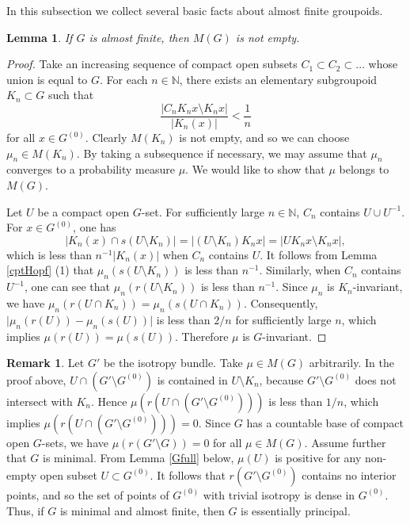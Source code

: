 \documentclass[11pt]{article}
\newtheorem{lem}[thm]{Lemma}
\theoremstyle{definition}
\newtheorem{rem}[thm]{Remark}
\newcommand{\N}{\mathbb{N}}
\begin{document}
In this subsection 
we collect several basic facts about almost finite groupoids. 

\begin{lem}\label{Mneqempty}
If $G$ is almost finite, then $M(G)$ is not empty. 
\end{lem}
\begin{proof}
Take an increasing sequence of compact open subsets 
$C_1\subset C_2\subset\dots$ whose union is equal to $G$. 
For each $n\in\N$, 
there exists an elementary subgroupoid $K_n\subset G$ such that 
\[
\frac{\lvert C_nK_nx\setminus K_nx\rvert}{\lvert K_n(x)\rvert}<\frac{1}{n}
\]
for all $x\in G^{(0)}$. 
Clearly $M(K_n)$ is not empty, and so we can choose $\mu_n\in M(K_n)$. 
By taking a subsequence if necessary, 
we may assume that $\mu_n$ converges to a probability measure $\mu$. 
We would like to show that $\mu$ belongs to $M(G)$. 

Let $U$ be a compact open $G$-set. 
For sufficiently large $n\in\N$, $C_n$ contains $U\cup U^{-1}$. 
For $x\in G^{(0)}$, one has 
\[
\lvert K_n(x)\cap s(U\setminus K_n)\rvert
=\lvert (U\setminus K_n)K_nx\rvert=\lvert UK_nx\setminus K_nx\rvert, 
\]
which is less than $n^{-1}\lvert K_n(x)\rvert$ 
when $C_n$ contains $U$. 
It follows from Lemma \ref{cptHopf} (1) that 
$\mu_n(s(U\setminus K_n))$ is less than $n^{-1}$. 
Similarly, when $C_n$ contains $U^{-1}$, 
one can see that $\mu_n(r(U\setminus K_n))$ is less than $n^{-1}$. 
Since $\mu_n$ is $K_n$-invariant, 
we have $\mu_n(r(U\cap K_n))=\mu_n(s(U\cap K_n))$. 
Consequently, $\lvert\mu_n(r(U))-\mu_n(s(U))\rvert$ is less than $2/n$ 
for sufficiently large $n$, which implies $\mu(r(U))=\mu(s(U))$. 
Therefore $\mu$ is $G$-invariant. 
\end{proof}

\begin{rem}
Let $G'$ be the isotropy bundle. 
Take $\mu\in M(G)$ arbitrarily. 
In the proof above, 
$U\cap(G'\setminus G^{(0)})$ is contained in $U\setminus K_n$, 
because $G'\setminus G^{(0)}$ does not intersect with $K_n$. 
Hence $\mu(r(U\cap(G'\setminus G^{(0)})))$ is less than $1/n$, 
which implies $\mu(r(U\cap(G'\setminus G^{(0)})))=0$. 
Since $G$ has a countable base of compact open $G$-sets, 
we have $\mu(r(G'\setminus G))=0$ for all $\mu\in M(G)$. 
Assume further that $G$ is minimal. 
From Lemma \ref{Gfull} below, 
$\mu(U)$ is positive for any non-empty open subset $U\subset G^{(0)}$. 
It follows that $r(G'\setminus G^{(0)})$ contains no interior points, and so 
the set of points of $G^{(0)}$ with trivial isotropy is dense in $G^{(0)}$. 
Thus, if $G$ is minimal and almost finite, then 
$G$ is essentially principal. 
\end{rem}
\end{document}
